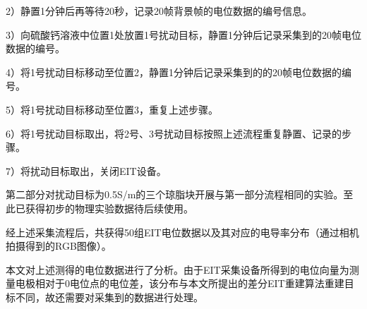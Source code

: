      2）静置1分钟后再等待20秒，记录20帧背景帧的电位数据的编号信息。

     3）向硫酸钙溶液中位置1处放置1号扰动目标，静置1分钟后记录采集到的20帧电位数据的编号。

     4）将1号扰动目标移动至位置2，静置1分钟后记录采集到的的20帧电位数据的编号。

     5）将1号扰动目标移动至位置3，重复上述步骤。

     6）将1号扰动目标取出，将2号、3号扰动目标按照上述流程重复静置、记录的步骤。

     7）将扰动目标取出，关闭EIT设备。


第二部分对扰动目标为0.5S/m的三个琼脂块开展与第一部分流程相同的实验。至此已获得初步的物理实验数据待后续使用。

经上述采集流程后，共获得50组EIT电位数据以及其对应的电导率分布（通过相机拍摄得到的RGB图像）。

\label{geneD}
本文对上述测得的电位数据进行了分析。由于EIT采集设备所得到的电位向量为测量电极相对于0电位点的电位差，该分布与本文所提出的差分EIT重建算法重建目标不同，故还需要对采集到的数据进行处理。

